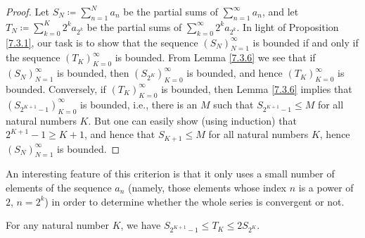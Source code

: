 \begin{proof}
    Let \(S_N \coloneqq \sum_{n = 1}^N a_n\) be the partial sums of \(\sum_{n = 1}^\infty a_n\), and let \(T_N \coloneqq \sum_{k = 0}^K 2^k a_{2^k}\) be the partial sums of \(\sum_{k = 0}^\infty 2^k a_{2^k}\).
    In light of Proposition \ref{7.3.1}, our task is to show that the sequence \((S_N)_{N = 1}^\infty\) is bounded if and only if the sequence \((T_K)_{K = 0}^\infty\) is bounded.
    From Lemma \ref{7.3.6} we see that if \((S_N)_{N = 1}^\infty\) is bounded, then \((S_{2^K})_{K = 0}^\infty\) is bounded, and hence \((T_K)_{K = 0}^\infty\) is bounded.
    Conversely, if \((T_K)_{K = 0}^\infty\) is bounded, then Lemma \ref{7.3.6} implies that \((S_{2^{K + 1} - 1})_{K = 0}^\infty\) is bounded, i.e., there is an \(M\) such that \(S_{2^{K + 1} - 1} \leq M\) for all natural numbers \(K\).
    But one can easily show (using induction) that \(2^{K + 1} - 1 \geq K + 1\), and hence that \(S_{K + 1} \leq M\) for all natural numbers \(K\), hence \((S_N)_{N = 1}^\infty\) is bounded.
\end{proof}

\begin{remark}\label{7.3.5}
    An interesting feature of this criterion is that it only uses a small number of elements of the sequence \(a_n\)
    (namely, those elements whose index \(n\) is a power of \(2\), \(n = 2^k\))
    in order to determine whether the whole series is convergent or not.
\end{remark}

\begin{lemma}\label{7.3.6}
    For any natural number \(K\), we have \(S_{2^{K + 1} - 1} \leq T_K \leq 2S_{2^K}\).
\end{lemma}

